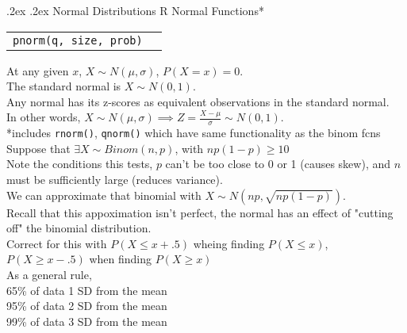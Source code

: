 \documentclass[10pt,landscape]{article}
\makeatletter
\renewcommand{\subsection}{\@startsection{subsection}{2}{0mm}%
                                {.2ex}%
                                {.2ex}%
                                {\normalfont\normalsize\bfseries}}
\makeatother
\begin{document}
\begin{multicols}{3}
\subsection{Normal Distributions}
R Normal Functions*
\begin{tabular}{@{}p{\the\MyLen}%
                @{}p{\linewidth-\the\MyLen}@{}}
\verb!pnorm(q, size, prob)! & \hskip3em $P(X< \verb!q!)$ \\
\end{tabular}
At any given $x$, $X \sim N(\mu, \sigma)$, $P(X = x) = 0$. \\
The standard normal is $X \sim N(0, 1)$. \\
Any normal has its z-scores as equivalent observations in the standard normal. \\
In other words, $X \sim N(\mu, \sigma) \implies Z = \frac{X - \mu}{\sigma} \sim N(0, 1)$. \\
*includes \verb!rnorm()!, \verb!qnorm()! which have same functionality as the binom fcns \\
Suppose that $\exists X \sim Binom(n, p)$, with $np(1 - p) \geq 10$ \\
Note the conditions this tests, $p$ can't be too close to 0 or 1 (causes skew), and $n$ must be sufficiently large (reduces variance). \\
We can approximate that binomial with $X \sim N(np, \sqrt{np(1 - p)})$. \\
Recall that this appoximation isn't perfect, the normal has an effect of "cutting off" the binomial distribution. \\
Correct for this with $P(X \leq x + .5)$ wheing finding $P(X \leq x)$, $P(X \geq x - .5)$ when finding $P(X \geq x)$ \\
As a general rule, \\
65\% of data 1 SD from the mean \\
95\% of data 2 SD from the mean \\
99\% of data 3 SD from the mean \\

\end{multicols}
\end{document}

